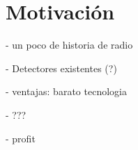 \chapter{Motivaci\'on}

- un poco de historia de radio

- Detectores existentes (?)

- ventajas: barato tecnologia 

- ???

- profit